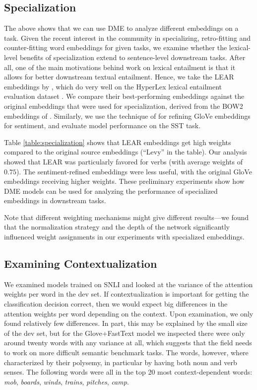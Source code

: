 \documentclass[11pt,a4paper]{article}
\begin{document}
\subsection{Specialization}

The above shows that we can use DME to analyze different embeddings on a task. Given the recent interest in the community in specializing, retro-fitting and counter-fitting word embeddings for given tasks, we examine whether the lexical-level benefits of specialization extend to sentence-level downstream tasks. After all, one of the main motivations behind work on lexical entailment is that it allows for better downstream textual entailment. Hence, we take the LEAR embeddings by , which do very well on the HyperLex lexical entailment evaluation dataset \cite{Vulic:2017cl}. We compare their best-performing embeddings against the original embeddings that were used for specialization, derived from the BOW2 embeddings of . Similarly, we use the technique of  for refining GloVe embeddings for sentiment, and evaluate model performance on the SST task.

Table \ref{table:specialization} shows that LEAR embeddings get high weights compared to the original source embeddings (``Levy'' in the table). Our analysis showed that LEAR was particularly favored for verbs (with average weights of $0.75$). The sentiment-refined embeddings were less useful, with the original GloVe embeddings receiving higher weights. These preliminary experiments show how DME models can be used for analyzing the performance of specialized embeddings in downstream tasks.

Note that different weighting mechanisms might give different results---we found that the normalization strategy and the depth of the network significantly influenced weight assignments in our experiments with specialized embeddings.

\subsection{Examining Contextualization}

We examined models trained on SNLI and looked at the variance of the attention weights per word in the dev set. If contextualization is important for getting the classification decision correct, then we would expect big differences in the attention weights per word depending on the context. Upon examination, we only found relatively few differences. In part, this may be explained by the small size of the dev set, but for the Glove+FastText model we inspected there were only around twenty words with any variance at all, which suggests that the field needs to work on more difficult semantic benchmark tasks. The words, however, where characterized by their polysemy, in particular by having both noun and verb senses. The following words were all in the top 20 most context-dependent words: \emph{mob}, \emph{boards}, \emph{winds}, \emph{trains}, \emph{pitches}, \emph{camp}.
\end{document}
